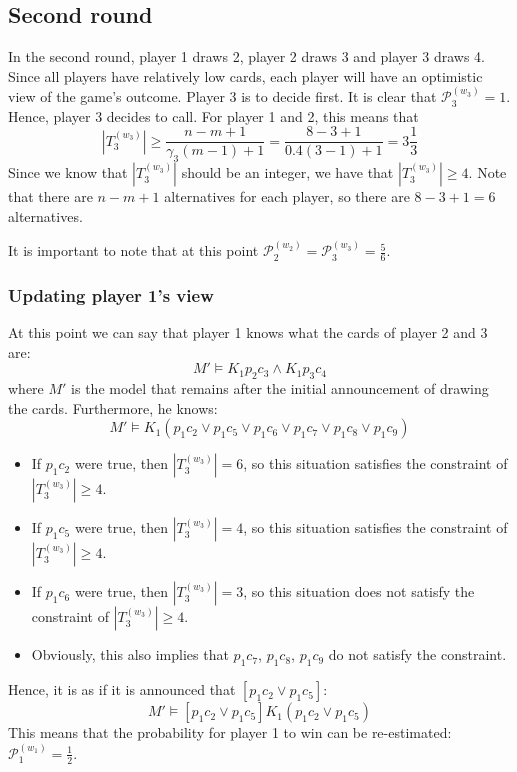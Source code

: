 \documentclass[a4paper,10pt]{article}
\begin{document}
\subsection{Second round}
In the second round, player 1 draws 2, player 2 draws 3 and player 3 draws 4. Since all players have relatively low cards, each player will have an optimistic view of the game's outcome. Player 3 is to decide first. It is clear that $\mathcal{P}^{(w_3)}_3=1$. Hence, player 3 decides to call. For player 1 and 2, this means that
\begin{equation*}
 |T_3^{(w_3)}| \geq \frac{n-m+1}{\gamma_3 (m-1)+1} = \frac{8-3+1}{0.4(3-1)+1} = 3\frac{1}{3}
\end{equation*}
Since we know that $|T_3^{(w_3)}|$ should be an integer, we have that $|T_3^{(w_3)}|\geq 4$. Note that there are $n-m+1$ alternatives for each player, so there are $8-3+1=6$ alternatives. 

It is important to note that at this point $\mathcal{P}^{(w_2)}_2 = \mathcal{P}^{(w_3)}_3 = \frac{5}{6}$.

\subsubsection{Updating player 1's view}
At this point we can say that player 1 knows what the cards of player 2 and 3 are: 
\begin{equation*}
M' \models K_1 p_2c_3 \wedge K_1p_3c_4 
\end{equation*}
where $M'$ is the model that remains after the initial announcement of drawing the cards. Furthermore, he knows:
\begin{equation*}
 M' \models K_1(p_1 c_2 \vee p_1 c_5 \vee p_1 c_6 \vee p_1 c_7 \vee p_1 c_8 \vee p_1 c_9)
\end{equation*}
\begin{itemize}
 \item If $p_1 c_2$ were true, then $|T_3^{(w_3)}| = 6$, so this situation satisfies the constraint of $|T_3^{(w_3)}| \geq 4$.
 \item If $p_1 c_5$ were true, then $|T_3^{(w_3)}| = 4$, so this situation satisfies the constraint of $|T_3^{(w_3)}| \geq 4$.
 \item If $p_1 c_6$ were true, then $|T_3^{(w_3)}| = 3$, so this situation does not satisfy the constraint of $|T_3^{(w_3)}| \geq 4$.
 \item Obviously, this also implies that $p_1 c_7$, $p_1 c_8$, $p_1 c_9$ do not satisfy the constraint.   
\end{itemize}
Hence, it is as if it is announced that $[p_1 c_2 \vee p_1 c_5]$:
\begin{equation}
M'\models [p_1 c_2 \vee p_1 c_5] K_1 (p_1 c_2 \vee p_1 c_5)
\end{equation}
This means that the probability for player 1 to win can be re-estimated: $\mathcal{P}^{(w_1)}_1 = \frac{1}{2}$.
\end{document}
